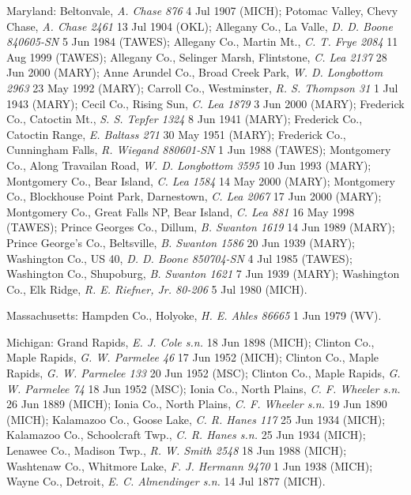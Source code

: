 \documentclass{article}
\begin{document}
Maryland:
Beltonvale, \textit{A. Chase 876} 4 Jul 1907 (MICH);
Potomac Valley, Chevy Chase, \textit{A. Chase 2461} 13 Jul 1904 (OKL);
Allegany Co., La Valle, \textit{D. D. Boone 840605-SN} 5 Jun 1984 (TAWES);
Allegany Co., Martin Mt., \textit{C. T. Frye 2084} 11 Aug 1999 (TAWES);
Allegany Co., Selinger Marsh, Flintstone, \textit{C. Lea 2137} 28 Jun 2000 (MARY);
Anne Arundel Co., Broad Creek Park, \textit{W. D. Longbottom 2963} 23 May 1992 (MARY);
Carroll Co., Westminster, \textit{R. S. Thompson 31} 1 Jul 1943 (MARY);
Cecil Co., Rising Sun, \textit{C. Lea 1879} 3 Jun 2000 (MARY);
Frederick Co., Catoctin Mt., \textit{S. S. Tepfer 1324} 8 Jun 1941 (MARY);
Frederick Co., Catoctin Range, \textit{E. Baltass 271} 30 May 1951 (MARY);
Frederick Co., Cunningham Falls, \textit{R. Wiegand 880601-SN} 1 Jun 1988 (TAWES);
Montgomery Co., Along Travailan Road, \textit{W. D. Longbottom 3595} 10 Jun 1993 (MARY);
Montgomery Co., Bear Island, \textit{C. Lea 1584} 14 May 2000 (MARY);
Montgomery Co., Blockhouse Point Park, Darnestown, \textit{C. Lea 2067} 17 Jun 2000 (MARY);
Montgomery Co., Great Falls NP, Bear Island, \textit{C. Lea 881} 16 May 1998 (TAWES);
Prince Georges Co., Dillum, \textit{B. Swanton 1619} 14 Jun 1989 (MARY);
Prince George's Co., Beltsville, \textit{B. Swanton 1586} 20 Jun 1939 (MARY);
Washington Co., US 40, \textit{D. D. Boone 850704-SN} 4 Jul 1985 (TAWES);
Washington Co., Shupoburg, \textit{B. Swanton 1621} 7 Jun 1939 (MARY);
Washington Co., Elk Ridge, \textit{R. E. Riefner, Jr. 80-206} 5 Jul 1980 (MICH).

Massachusetts:
Hampden Co., Holyoke, \textit{H. E. Ahles 86665} 1 Jun 1979 (WV).

Michigan:
Grand Rapids, \textit{E. J. Cole s.n.} 18 Jun 1898 (MICH);
Clinton Co., Maple Rapids, \textit{G. W. Parmelee 46} 17 Jun 1952 (MICH);
Clinton Co., Maple Rapids, \textit{G. W. Parmelee 133} 20 Jun 1952 (MSC);
Clinton Co., Maple Rapids, \textit{G. W. Parmelee 74} 18 Jun 1952 (MSC);
Ionia Co., North Plains, \textit{C. F. Wheeler s.n.} 26 Jun 1889 (MICH);
Ionia Co., North Plains, \textit{C. F. Wheeler s.n.} 19 Jun 1890 (MICH);
Kalamazoo Co., Goose Lake, \textit{C. R. Hanes 117} 25 Jun 1934 (MICH);
Kalamazoo Co., Schoolcraft Twp., \textit{C. R. Hanes s.n.} 25 Jun 1934 (MICH);
Lenawee Co., Madison Twp., \textit{R. W. Smith 2548} 18 Jun 1988 (MICH);
Washtenaw Co., Whitmore Lake, \textit{F. J. Hermann 9470} 1 Jun 1938 (MICH);
Wayne Co., Detroit, \textit{E. C. Almendinger s.n.} 14 Jul 1877 (MICH).
\end{document}
